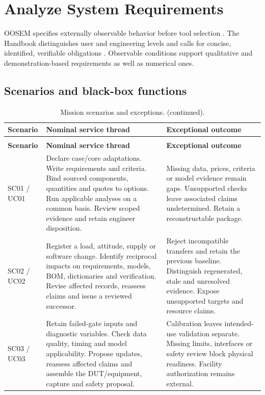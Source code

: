 \section{Analyze System Requirements}
\label{section:analyze-system-requirements}

OOSEM specifies externally observable behavior before tool selection \citep[Sec.~17.3.3]{friedenthal2014practical}. The Handbook distinguishes user and engineering levels and calls for concise, identified, verifiable obligations \citep[Sec.~I.4.1]{aguado2021cubesatse}. Observable conditions support qualitative and demonstration-based requirements as well as numerical ones.

\subsection{Scenarios and black-box functions}
{\small
\setlength{\tabcolsep}{4pt}
\setlength{\parskip}{0pt}
\setlength{\LTpre}{0.4\baselineskip}
\setlength{\LTpost}{0.4\baselineskip}
\renewcommand{\arraystretch}{1.06}
\begin{longtable}{@{}>{\raggedright\arraybackslash}p{}>{\raggedright\arraybackslash}p{}>{\raggedright\arraybackslash}p{}@{}}
\caption{Mission scenarios and exceptions.}\label{tab:framework-scenarios}\\
\toprule
\textbf{Scenario} & \textbf{Nominal service thread} & \textbf{Exceptional outcome} \\
\midrule
\endfirsthead
\caption[]{Mission scenarios and exceptions. (continued).}\\
\toprule
\textbf{Scenario} & \textbf{Nominal service thread} & \textbf{Exceptional outcome} \\
\midrule
\endhead
\bottomrule
\endfoot
SC01 / UC01 & Declare case/core adaptations. Write requirements and criteria. Bind sourced components, quantities and quotes to options. Run applicable analyses on a common basis. Review scoped evidence and retain engineer disposition. & Missing data, prices, criteria or model evidence remain gaps. Unsupported checks leave associated claims undetermined. Retain a reconstructable package. \\
SC02 / UC02 & Register a load, attitude, supply or software change. Identify reciprocal impacts on requirements, models, BOM, dictionaries and verification. Revise affected records, reassess claims and issue a reviewed successor. & Reject incompatible transfers and retain the previous baseline. Distinguish regenerated, stale and unresolved evidence. Expose unsupported targets and resource claims. \\
SC03 / UC03 & Retain failed-gate inputs and diagnostic variables. Check data quality, timing and model applicability. Propose updates, reassess affected claims and assemble the DUT/equipment, capture and safety proposal. & Calibration leaves intended-use validation separate. Missing limits, interfaces or safety review block physical readiness. Facility authorization remains external. \\
\end{longtable}
}
